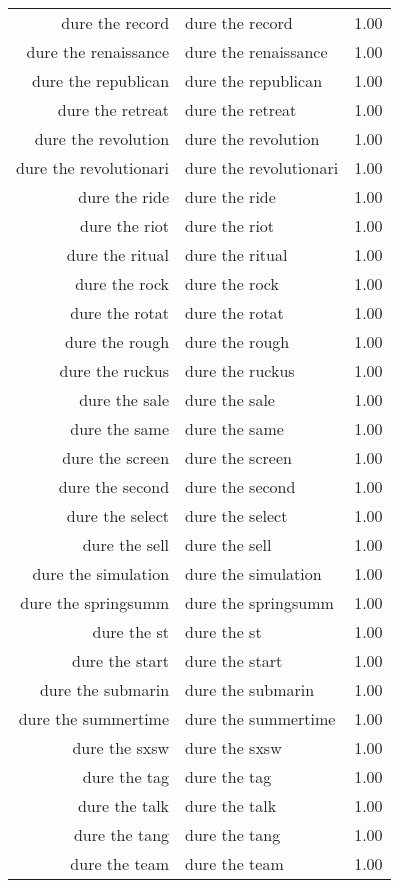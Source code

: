\begin{table}[ht]
\begin{tabular}{rlr}
  dure the record & dure the record & 1.00 \\ 
  dure the renaissance & dure the renaissance & 1.00 \\ 
  dure the republican & dure the republican & 1.00 \\ 
  dure the retreat & dure the retreat & 1.00 \\ 
  dure the revolution & dure the revolution & 1.00 \\ 
  dure the revolutionari & dure the revolutionari & 1.00 \\ 
  dure the ride & dure the ride & 1.00 \\ 
  dure the riot & dure the riot & 1.00 \\ 
  dure the ritual & dure the ritual & 1.00 \\ 
  dure the rock & dure the rock & 1.00 \\ 
  dure the rotat & dure the rotat & 1.00 \\ 
  dure the rough & dure the rough & 1.00 \\ 
  dure the ruckus & dure the ruckus & 1.00 \\ 
  dure the sale & dure the sale & 1.00 \\ 
  dure the same & dure the same & 1.00 \\ 
  dure the screen & dure the screen & 1.00 \\ 
  dure the second & dure the second & 1.00 \\ 
  dure the select & dure the select & 1.00 \\ 
  dure the sell & dure the sell & 1.00 \\ 
  dure the simulation & dure the simulation & 1.00 \\ 
  dure the springsumm & dure the springsumm & 1.00 \\ 
  dure the st & dure the st & 1.00 \\ 
  dure the start & dure the start & 1.00 \\ 
  dure the submarin & dure the submarin & 1.00 \\ 
  dure the summertime & dure the summertime & 1.00 \\ 
  dure the sxsw & dure the sxsw & 1.00 \\ 
  dure the tag & dure the tag & 1.00 \\ 
  dure the talk & dure the talk & 1.00 \\ 
  dure the tang & dure the tang & 1.00 \\ 
  dure the team & dure the team & 1.00 \\ 

\end{tabular}
\end{table}
